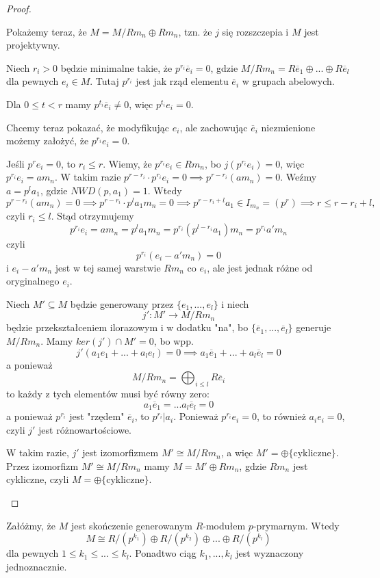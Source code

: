 \begin{proof}
\begin{enumerate}
    Pokażemy teraz, że $M=M/Rm_n\oplus Rm_n$, tzn. że $j$ się rozszczepia i $M$ jest projektywny.

    Niech $r_i>0$ będzie minimalne takie, że $p^{r_i}\overline{e}_i=0$, gdzie $M/Rm_n=R\overline{e}_1\oplus...\oplus R\overline{e}_l$ dla pewnych $e_i\in M$. Tutaj $p^{r_i}$ jest jak rząd elementu $\overline{e}_i$ w grupach abelowych.

    Dla $0\leq t < r$ mamy $p^{t_i}\overline{e}_i\neq 0$, więc $p^{t_i}e_i=0$.

    Chcemy teraz pokazać, że modyfikując $e_i$, ale zachowując $\overline{e}_i$ niezmienione możemy założyć, że $p^{r_i}e_i=0$.

      Jeśli $p^re_i=0$, to $r_i\leq r$. Wiemy, że $p^{r_i}e_i\in Rm_n$, bo $j(p^{r_i}e_i)=0$, więc $p^{r_i}e_i=am_n$. W takim razie $p^{r-r_i}\cdot p^{r_i}e_i=0\implies p^{r-r_i}(am_n)=0$. Weźmy $a=p^la_1$, gdzie $NWD(p, a_1)=1$. Wtedy 
      $$p^{r-r_i}(am_n)=0\implies p^{r-r_i}\cdot p^l a_1m_n=0\implies p^{r-r_i+l}a_1\in I_{m_n}=(p^r)\implies r\leq r-r_i+l,$$
      czyli $r_i\leq l$. Stąd otrzymujemy
      $$p^{r_i}e_i=am_n=p^la_1m_n=p^{r_i}(p^{l-r_i}a_1)m_n=p^{r_i}a'm_n$$
      czyli
      $$p^{r_i}(e_i-a'm_n)=0$$
      i $e_i-a'm_n$ jest w tej samej warstwie $Rm_n$ co $e_i$, ale jest jednak różne od oryginalnego $e_i$.

      Niech $M'\subseteq M$ będzie generowany przez $\{e_1,...,e_l\}$ i niech 
      $$j':M'\to M/Rm_n$$ 
      będzie przekształceniem ilorazowym i w dodatku "na", bo $\{\overline{e}_1,...,\overline{e}_l\}$ generuje $M/Rm_n$. Mamy $ker(j')\cap M'=0$, bo wpp. 
      $$j'(a_1e_1+...+a_le_l)=0\implies a_1\overline{e}_1+...+a_l\overline{e}_l=0$$
      a ponieważ
      $$M/Rm_n=\bigoplus_{i\leq l}R\overline{e}_i$$
      to każdy z tych elementów musi być równy zero:
      $$a_1\overline{e}_1=...a_l\overline{e}_l=0$$
      a ponieważ $p^{r_i}$ jest "rzędem" $\overline{e}_i$, to $p^{r_i}|a_i$. Ponieważ $p^{r_i}e_i=0$, to również $a_ie_i=0$, czyli $j'$ jest różnowartościowe.

      W takim razie, $j'$ jest izomorfizmem $M'\cong M/Rm_n$, a więc $M'=\oplus\{\text{cykliczne}\}$. Przez izomorfizm $M'\cong M/Rm_n$ mamy $M=M'\oplus Rm_n$, gdzie $Rm_n$ jest cykliczne, czyli $M=\oplus\{\text{cykliczne}\}$.
  \end{enumerate}
\end{proof}

\begin{remark}
  Załóżmy, że $M$ jest skończenie generowanym $R$-modułem $p$-prymarnym. Wtedy
  $$M\cong R/(p^{k_1})\oplus R/(p^{k_2})\oplus...\oplus R/(p^{k_l})$$
  dla pewnych $1\leq k_1\leq ...\leq k_l$. Ponadtwo ciąg $k_1,...,k_l$ jest wyznaczony jednoznacznie.
\end{remark}

